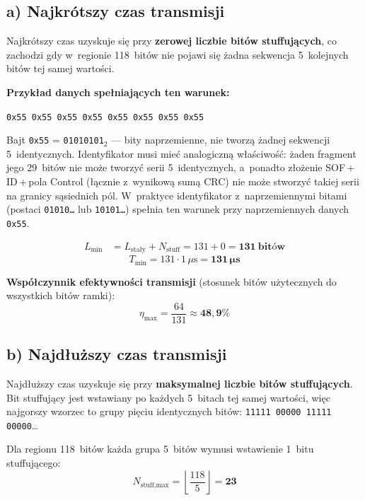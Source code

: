\documentclass[12pt,a4paper]{article}
\begin{document}
\subsection*{a) Najkrótszy czas transmisji}

Najkrótszy czas uzyskuje się przy \textbf{zerowej liczbie bitów stuffujących},
co zachodzi gdy w~regionie 118~bitów nie pojawi się żadna sekwencja 5~kolejnych
bitów tej samej wartości.

\textbf{Przykład danych spełniających ten warunek:}
\begin{center}
\texttt{0x55 0x55 0x55 0x55 0x55 0x55 0x55 0x55}
\end{center}
Bajt \texttt{0x55} = \texttt{01010101}$_2$ — bity naprzemienne, nie tworzą
żadnej sekwencji 5~identycznych.
Identyfikator musi mieć analogiczną właściwość: żaden fragment jego 29~bitów
nie może tworzyć serii 5~identycznych, a~ponadto złożenie SOF\,+\,ID\,+\,pola
Control (łącznie z~wynikową sumą CRC) nie może stworzyć takiej serii na granicy
sąsiednich pól. W~praktyce identyfikator z~naprzemiennymi bitami
(postaci \texttt{01010\ldots} lub \texttt{10101\ldots}) spełnia ten warunek
przy naprzemiennych danych \texttt{0x55}.

\begin{align*}
L_{\min} &= L_{\text{stały}} + N_{\text{stuff}} = 131 + 0 = \mathbf{131\ \text{bitów}}
\end{align*}
\[
\boxed{T_{\min} = 131 \cdot 1\,\mu\text{s} = \mathbf{131\,\mu\text{s}}}
\]

\textbf{Współczynnik efektywności transmisji} (stosunek bitów użytecznych do
wszystkich bitów ramki):
\[
\eta_{\max} = \frac{64}{131} \approx \mathbf{48{,}9\%}
\]

\subsection*{b) Najdłuższy czas transmisji}

Najdłuższy czas uzyskuje się przy \textbf{maksymalnej liczbie bitów stuffujących}.
Bit stuffujący jest wstawiany po każdych 5~bitach tej samej wartości, więc
najgorszy wzorzec to grupy pięciu identycznych bitów:
\texttt{11111\,00000\,11111\,00000}\ldots

Dla regionu 118~bitów każda grupa 5~bitów wymusi wstawienie 1~bitu stuffującego:
\[
N_{\text{stuff,max}} = \left\lfloor \frac{118}{5} \right\rfloor = \mathbf{23}
\]
\end{document}
